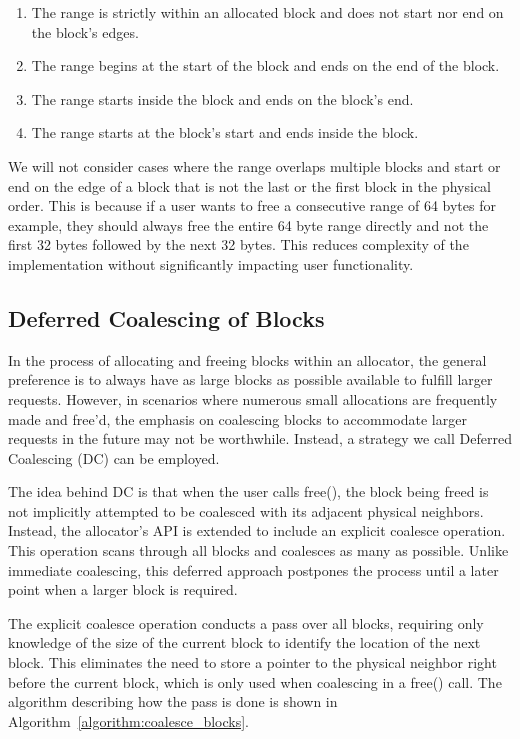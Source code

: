 \begin{enumerate}
    \item The range is strictly within an allocated block and does not start nor end on the block's edges.
    \item The range begins at the start of the block and ends on the end of the block.
    \item The range starts inside the block and ends on the block's end.
    \item The range starts at the block's start and ends inside the block.
\end{enumerate}

We will not consider cases where the range overlaps multiple blocks and start or end on the edge of a block that is not the last or the first block in the physical order. This is because if a user wants to free a consecutive range of 64 bytes for example, they should always free the entire 64 byte range directly and not the first 32 bytes followed by the next 32 bytes. This reduces complexity of the implementation without significantly impacting user functionality.

\subsection{Deferred Coalescing of Blocks}

In the process of allocating and freeing blocks within an allocator, the general preference is to always have as large blocks as possible available to fulfill larger requests. However, in scenarios where numerous small allocations are frequently made and free'd, the emphasis on coalescing blocks to accommodate larger requests in the future may not be worthwhile. Instead, a strategy we call Deferred Coalescing (DC) can be employed.

The idea behind DC is that when the user calls free(), the block being freed is not implicitly attempted to be coalesced with its adjacent physical neighbors. Instead, the allocator's API is extended to include an explicit coalesce operation. This operation scans through all blocks and coalesces as many as possible. Unlike immediate coalescing, this deferred approach postpones the process until a later point when a larger block is required.

The explicit coalesce operation conducts a pass over all blocks, requiring only knowledge of the size of the current block to identify the location of the next block. This eliminates the need to store a pointer to the physical neighbor right before the current block, which is only used when coalescing in a free() call. The algorithm describing how the pass is done is shown in Algorithm~\ref{algorithm:coalesce_blocks}.

